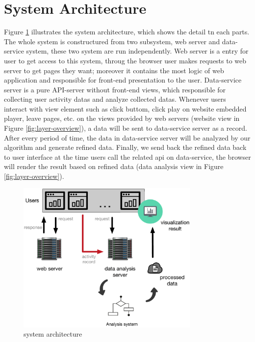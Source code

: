 \section{System Architecture}
Figure \ref{fig:sys-arch} illustrates the system architecture, which shows the detail tn each parts.
The whole system is constructured from two subsystem, web server and data-service system, these two system are run independently.
Web server is a entry for user to get access to this system, throug the browser user makes requests to web server to get pages they want;
moreover it contains the most logic of web application and responsible for front-end presentation to the user.
Data-service server is a pure API-server without front-end views, which responsible for collecting user activity datas and analyze collected datas.
Whenever users interact with view element such as click buttom, click play on website embedded player, leave pages, etc. on the views provided by web servers (website view in Figure \ref{fig:layer-overview}),
a data will be sent to data-service server as a record.
After every period of time, the data in data-service server will be analyzed by our algorithm and generate refined data.
Finally, we send back the refined data back to user interface at the time users call the related api on data-service, the browser will render the result based on refined data (data analysis view in Figure \ref{fig:layer-overview}).

\begin{figure}[H]
    \centering
    \includegraphics[width = 0.8\textwidth]{fig/system-architecture-outline.eps}
    \caption{system architecture}
    \label{fig:sys-arch}
\end{figure}

